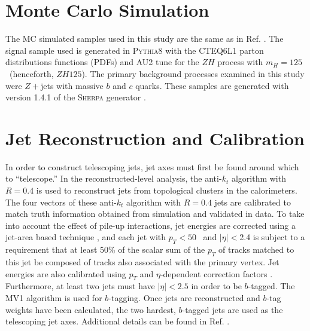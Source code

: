 \section{Monte Carlo Simulation}
\label{sec:mc}
The MC simulated samples used in this study are the same as in Ref. \cite{conf}.  The signal sample used is generated in \textsc{Pythia8} \cite{tjconf18} with the CTEQ6L1 parton distributions functions (PDFs) and AU2 tune\cite{tjconf19,tjconf20,tjconf21} for the $ZH$ process with $m_H=125$ \GeV\ (henceforth, $ZH125$).  The primary background processes examined in this study were $Z+$jets with massive $b$ and $c$ quarks.  These samples are generated with version 1.4.1 of the \textsc{Sherpa} generator \cite{tjconf28}.%

\section{Jet Reconstruction and Calibration}
\label{sec:cal}
In order to construct telescoping jets, jet axes must first be found around which to ``telescope.''  In the reconstructed-level analysis, the anti-$k_t$ algorithm with $R=0.4$ is used to reconstruct jets from topological clusters in the calorimeters.  The four vectors of these anti-$k_t$ algorithm with $R=0.4$ jets are calibrated to match truth information obtained from simulation and validated in data.  To take into account the effect of pile-up interactions, jet energies are corrected using a jet-area based technique \cite{tjconf54}, and each jet with $p_T<50$ \GeV\ and $\left|\eta\right|<$2.4 is subject to a requirement that at least 50\% of the scalar sum of the $p_T$ of tracks matched to this jet be composed of tracks also associated with the primary vertex.  Jet energies are also calibrated using $p_T$ and $\eta$-dependent correction factors \cite{tjconf55}.  Furthermore, at least two jets must have $\left|\eta\right|<2.5$ in order to be $b$-tagged.  The MV1 algorithm \cite{tjconf56,conf57,conf58,conf59,conf60} is used for $b$-tagging.  Once jets are reconstructed and $b$-tag weights have been calculated, the two hardest, $b$-tagged jets are used as the telescoping jet axes.  Additional details can be found in Ref. \cite{tjconf}.

